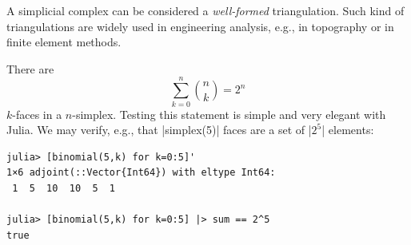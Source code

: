A simplicial complex can be considered a \emph{well-formed}
triangulation.  Such kind of triangulations are widely used in
engineering analysis, e.g., in topography or in finite element
methods.

\begin{coding}
There are 
\[
\sum_{k=0}^{n} {n \choose k} = 2^n
\] 
$k$-faces in a $n$-simplex. Testing this statement is simple and very elegant with Julia. 
We may verify, e.g., that |simplex(5)| faces are a set of |$2^5$| elements:
\begin{lstlisting}[language=JuliaLocal, style=julia, mathescape = true]
julia> [binomial(5,k) for k=0:5]'
1×6 adjoint(::Vector{Int64}) with eltype Int64:
 1  5  10  10  5  1

julia> [binomial(5,k) for k=0:5] |> sum == 2^5
true
\end{lstlisting}


\end{coding}

